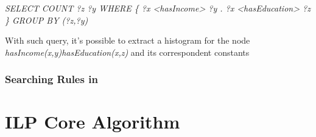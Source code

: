 \begin{center}
 \emph{SELECT COUNT ?z ?y WHERE \{ ?x <hasIncome> ?y . ?x <hasEducation> ?z \} GROUP BY (?z,?y)}
\end{center}

With such query, it's possible to extract a histogram for the node \emph{hasIncome(x,y)hasEducation(x,z)} and its correspondent constants 

\subsubsection{Searching Rules in \graphname}

\subsubsection{}



\section{ILP Core Algorithm}


